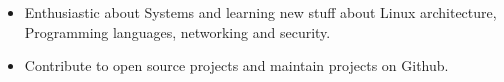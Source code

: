 



{\fontsize{11pt}{1em}\bodyfontlight\upshape\color{text}
\begin{itemize}
  \itemsep-0.3em
    \item Enthusiastic about Systems and learning new stuff about Linux architecture, Programming languages, networking and security.
    \item Contribute to open source projects and maintain projects on Github.
\end{itemize}
}
